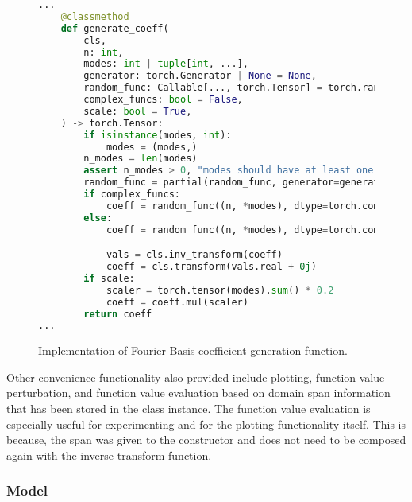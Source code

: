 \begin{figure}[H]
  \centering
  \begin{lstlisting}[language=Python]
...
    @classmethod
    def generate_coeff(
        cls,
        n: int,
        modes: int | tuple[int, ...],
        generator: torch.Generator | None = None,
        random_func: Callable[..., torch.Tensor] = torch.randn,
        complex_funcs: bool = False,
        scale: bool = True,
    ) -> torch.Tensor:
        if isinstance(modes, int):
            modes = (modes,)
        n_modes = len(modes)
        assert n_modes > 0, "modes should have at least one element"
        random_func = partial(random_func, generator=generator)
        if complex_funcs:
            coeff = random_func((n, *modes), dtype=torch.complex64)
        else:
            coeff = random_func((n, *modes), dtype=torch.complex64)

            vals = cls.inv_transform(coeff)
            coeff = cls.transform(vals.real + 0j)
        if scale:
            scaler = torch.tensor(modes).sum() * 0.2
            coeff = coeff.mul(scaler)
        return coeff
...
  \end{lstlisting}
  \caption{Implementation of Fourier Basis coefficient generation function.}\label{fig:generate_coeff_impl}
\end{figure}

Other convenience functionality also provided include plotting, function value perturbation, and function value evaluation based on domain span information that has been stored in the class instance. The function value evaluation is especially useful for experimenting and for the plotting functionality itself. This is because, the span was given to the constructor and does not need to be composed again with the inverse transform function.

\subsubsection{Model}\label{sec:impl_model}

